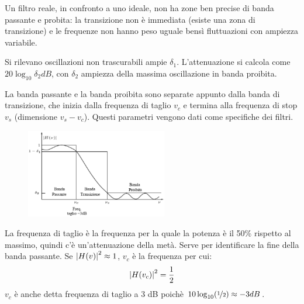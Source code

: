 Un filtro reale, in confronto a uno ideale, non ha zone ben precise di banda passante e probita: la transizione non è immediata (esiste una zona di transizione) e le frequenze non hanno peso uguale bensì fluttuazioni con ampiezza variabile. 

Si rilevano oscillazioni non trascurabili ampie $\delta_1$. L'attenuazione si calcola come $20\log_{10} \delta_2 dB$, con $\delta_2$ ampiezza della massima oscillazione in banda proibita. 

La banda passante e la banda proibita sono separate appunto dalla banda di transizione, che inizia dalla frequenza di taglio $v_c$ e termina alla frequenza di stop $v_s$ (dimensione $v_s - v_c$). Questi parametri vengono dati come specifiche dei filtri. 

\begin{figure}
	\vspace{-15pt}
	\includegraphics[width=0.55\textwidth]{Lezioni/Immagini/taglio}
	\vspace{-50pt}
\end{figure}

La frequenza di taglio è la frequenza per la quale la potenza è il 50\% rispetto al massimo, quindi c'è un'attenuazione della metà. Serve per identificare la fine della banda passante. Se $\left|H(v)\right|^2 \approx 1$, $v_c$ è la frequenza per cui:
$$\left|H(v_c)\right|^2 = \frac{1}{2}$$
$v_c$ è anche detta frequenza di taglio a 3 dB poichè $10\log_{10}(\nicefrac{1}{2}) \approx -3 dB$.
\bigskip
\bigskip







